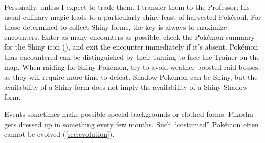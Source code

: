 Personally, unless I expect to trade them, I transfer them to the Professor;
 his usual culinary magic leads to a particularly shiny feast of harvested Pokésoul.
For those determined to collect Shiny forms, the key is always to maximize encounters.
Enter as many encounters as possible, check the Pokémon summary
  for the Shiny icon (),
  and exit the encounter immediately if it's absent.
Pokémon thus encountered can be distinguished by their turning to face the Trainer on the map.
When raiding for Shiny Pokémon, try to avoid weather-boosted raid bosses, as they will require more time to defeat.
Shadow Pokémon can be Shiny, but the availability of a Shiny form does not imply the availability
 of a Shiny Shadow form.


Events sometimes make possible special backgrounds or clothed forms.
Pikachu gets dressed up in something every few months.
Such ``costumed'' Pokémon often cannot be evolved (\autoref{sec:evolution}).

